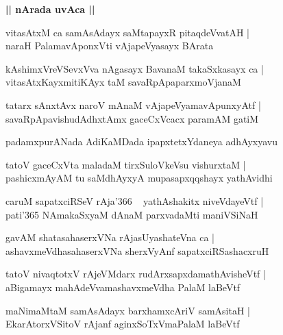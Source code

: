 \documentclass[twoside,12pt,openright]{book}
\newcounter{shloka}[chapter]
\def\uvaca#1{\centerline{{\large\textbf{#1}}}}
\begin{document}
\uvaca{|| nArada uvAca ||}

\begin{shloka}
vitasAtxM ca samAsAdayx saMtapayxR pitaqdeVvatAH |\\
naraH PalamavAponxVti vAjapeVyasayx BArata
\end{shloka}

\begin{shloka}
kAshimxVreVSevxVva nAgasayx BavanaM takaSxkasayx ca |\\
vitasAtxKayxmitiKAyx taM savaRpApaparxmoVjanaM 
\end{shloka}

\begin{shloka}
tatarx sAnxtAvx naroV mAnaM vAjapeVyamavApunxyAtf |\\
savaRpApavishudAdhxtAmx gaceCxVcacx paramAM gatiM 
\end{shloka}

\begin{center}
padamxpurANada AdiKaMDada ipapxtetxYdaneya adhAyxyavu
\end{center}

\begin{shloka}
tatoV gaceCxVta maladaM tirxSuloVkeVsu vishurxtaM |\\
pashicxmAyAM tu saMdhAyxyA mupasapxqqshayx yathAvidhi
\end{shloka}

\begin{shloka}
caruM sapatxciRSeV rAja\char'366 ~ yathAshakitx niveVdayeVtf |\\
pati\char'365 NAmakaSxyaM dAnaM parxvadaMti maniVSiNaH 
\end{shloka}

\begin{shloka}
gavAM shatasahaserxVNa rAjasUyashateVna ca |\\
ashavxmeVdhasahaserxVNa sherxVyAnf sapatxciRSashacxruH 
\end{shloka}

\begin{shloka}
tatoV nivaqtotxV rAjeVMdarx rudArxsapxdamathAvisheVtf |\\
aBigamayx mahAdeVvamashavxmeVdha PalaM laBeVtf 
\end{shloka}

\begin{shloka}
maNimaMtaM samAsAdayx barxhamxcAriV samAsitaH |\\
EkarAtorxVSitoV rAjanf aginxSoTxVmaPalaM laBeVtf 
\end{shloka}
\end{document}
